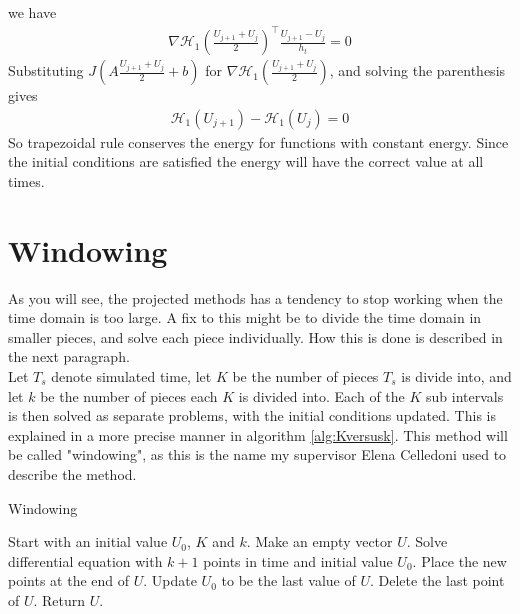 we have
\begin{equation*}
\begin{aligned}
\nabla \mathcal{H}_1 (\frac{U_{j+1}  + U_j}{2}) ^\top \frac{U_{j+1} - U_j}{ h_t } = 0
\end{aligned}
\end{equation*}
Substituting $ J (A\frac{U_{j+1}  + U_j}{2}  + b) $ for $\nabla \mathcal{H}_1 (\frac{U_{j+1}  + U_j}{2})$, and solving the parenthesis gives
\begin{equation*}
\begin{aligned}
\mathcal{H}_1(U_{j+1}) - \mathcal{H}_1(U_{j}) = 0
\end{aligned}
\end{equation*}
So trapezoidal rule conserves the energy for functions with constant energy. Since the initial conditions are satisfied the energy will have the correct value at all times.

\section{Windowing}%
As you will see, the projected methods has a tendency to stop working when the time domain is too large. A fix to this might be to divide the time domain in smaller pieces, and solve each piece individually. How this is done is described in the next paragraph.\\ 

Let $T_s$ denote simulated time, let $K$ be the number of pieces $T_s$ is divide into, and let $k$ be the number of pieces each $K$ is divided into. Each of the $K$ sub intervals is then solved as separate problems, with the initial conditions updated. This is explained in a more precise manner in algorithm \ref{alg:Kversusk}. This method will be called "windowing", as this is the name my supervisor Elena Celledoni \cite{elenaperson} used to describe the method.

\begin{algorithm} [h!]
\begin{algorithmic} \caption{ Windowing } \label{alg:Kversusk}  
\STATE Start with an initial value $U_0$, $K$ and $k$.
\STATE Make an empty vector $U$.
   \STATE Solve differential equation with $k+1$ points in time and initial value $U_0$.
   \STATE Place the new points at the end of $U$.
   \STATE Update $U_0$ to be the last value of $U$.
   \STATE Delete the last point of $U$.
\ENDFOR
\STATE Return $U$.
\end{algorithmic} 
\end{algorithm}


